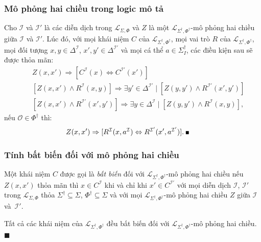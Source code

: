 \documentclass[fleqn]{beamer}
\newcommand{\mL}		{\mathcal{L}}
\newcommand{\mI}		{\mathcal{I}}
\newcommand{\mO}		{\mathcal{O}}
\newcommand{\SigmaDag}	{\Sigma^\dag}
\newcommand{\SigmaDagI}	{\Sigma^\dag_I}
\newcommand{\PhiDag}	{\Phi^\dag}
\newcommand{\mLSP}		{\mL_{\Sigma,\Phi}}
\newcommand{\mLSPD}		{\mL_{\Sigma^\dag,\Phi^\dag}}
\newcommand{\myend}		{\mbox{}\hfill\mbox{{\tiny$\!\blacksquare$}}}
\newcommand{\E}			{\exists}
\begin{document}
\begin{frame}\frametitle{\bf Mô phỏng hai chiều trong logic mô tả}
	\begin{lemma}
		Cho $\mI$ và $\mI'$ là các diễn dịch trong $\mLSP$ và $Z$ là một $\mLSPD$-mô phỏng hai chiều giữa $\mI$ và $\mI'$. Lúc đó, với mọi khái niệm $C$ của $\mLSPD$, mọi vai trò $R$ của $\mLSPD$, mọi đối tượng $x, y \in \Delta^\mI$, $x', y' \in \Delta^{\mI'}$ và mọi cá thể $a \in \SigmaDagI$, các điều kiện sau sẽ được thỏa mãn:
		\begin{eqnarray}
		&&\!\!\!\!\!\!\!\!\!\!\!\!\!\!Z(x, x') \Rightarrow [C^\mI(x) \Leftrightarrow C^{\mI'}(x')] \label{bs:eqC3}\\
		&&\!\!\!\!\!\!\!\!\!\!\!\!\!\![Z(x, x') \wedge R^\mI(x, y)] \Rightarrow \E y' \in \Delta^{\mI'} \mid [Z(y,y') \wedge R^{\mI'}(x',y')] \label{bs:eqR1}\\
		&&\!\!\!\!\!\!\!\!\!\!\!\!\!\![Z(x, x') \wedge R^{\mI'}(x', y')] \Rightarrow \E y \in \Delta^\mI \mid [Z(y,y') \wedge R^\mI(x,y)], \label{bs:eqR2}
		\end{eqnarray}
		nếu $\mO \in \PhiDag$ thì:
		\begin{eqnarray}
		&&\!\!\!\!\!\!\!\!\!\!\!\!\!\!Z(x, x') \Rightarrow [R^\mI(x, a^\mI) \Leftrightarrow R^{\mI'}(x', a^{\mI'})].\label{bs:eqOR}\ \myend
		\end{eqnarray}
	\end{lemma}
\end{frame}
\begin{frame}\frametitle{\bf Tính bất biến đối với mô phỏng hai chiều}
	Một khái niệm $C$ được gọi là {\em bất biến} đối với $\mLSPD$-mô phỏng hai chiều nếu $Z(x, x')$ thỏa mãn thì $x \in C^\mI$ khi và chỉ khi $x' \in C^{\mI'}$ với mọi diễn dịch $\mI$, $\mI'$ trong $\mLSP$ thỏa $\SigmaDag \subseteq \Sigma$, $\PhiDag \subseteq \Sigma$ và với mọi $\mLSPD$-mô phỏng hai chiều $Z$ giữa $\mI$ và~$\mI'$.
	\vspace{1.0ex}
	
	\begin{theorem}
		\label{th:Invariant}
		Tất cả các khái niệm của $\mLSPD$ đều bất biến đối với $\mLSPD$-mô phỏng hai chiều.\myend
	\end{theorem}
\end{frame}
\end{document}
